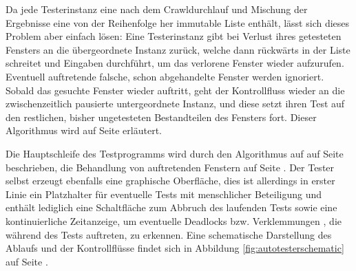 Da jede Testerinstanz
eine nach dem Crawldurchlauf und Mischung der Ergebnisse eine von 
der Reihenfolge her immutable Liste enthält, lässt sich dieses Problem aber
einfach lösen: Eine Testerinstanz gibt bei Verlust ihres getesteten Fensters
an die übergeordnete Instanz zurück, welche dann rückwärts in der Liste
schreitet und Eingaben durchführt, um das verlorene Fenster wieder aufzurufen.
Eventuell auftretende falsche, schon abgehandelte Fenster werden ignoriert.
Sobald das gesuchte Fenster wieder auftritt, geht der Kontrollfluss wieder an
die zwischenzeitlich pausierte untergeordnete Instanz, und diese setzt ihren
Test auf den restlichen, bisher ungetesteten Bestandteilen des Fensters fort.
Dieser Algorithmus wird auf Seite \pageref{alg:autotesterwindowloss} erläutert.

Die Hauptschleife des Testprogramms wird durch den Algorithmus auf auf Seite 
\pageref{alg:autotestermain} beschrieben, die Behandlung von auftretenden
Fenstern auf Seite \pageref{alg:autotesterpopup}. Der Tester selbst erzeugt
ebenfalls eine graphische Oberfläche, dies ist allerdings in erster Linie
ein Platzhalter für eventuelle Tests mit menschlicher Beteiligung und enthält
lediglich eine Schaltfläche zum Abbruch des laufenden Tests sowie eine
kontinuierliche Zeitanzeige, um eventuelle Deadlocks bzw. Verklemmungen \cite{deadlocks},
die während des Tests auftreten, zu erkennen. Eine schematische Darstellung
des Ablaufs und der Kontrollflüsse findet sich in Abbildung 
\ref{fig:autotesterschematic} auf Seite \pageref{fig:autotesterschematic}.

